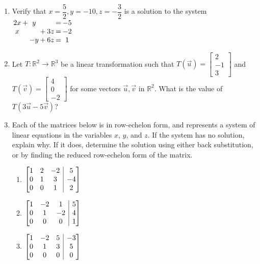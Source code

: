\documentclass[12pt]{article}
\makeatletter
\newcommand{\points}[1]{\marginpar{\hspace{24pt}[#1]}}
\newcommand{\R}{\mathbb{R}}
\newcommand{\bbm}{\begin{bmatrix}}
\newcommand{\ebm}{\end{bmatrix}}
\newenvironment{amatrix}[1]{%
  \left[\begin{array}{@{}*{#1}{c}|c@{}}
}{%
  \end{array}\right]
}
\makeatother
\begin{document}
\begin{enumerate}
\vspace{2in}

\item Verify that $x=\dfrac{5}{2}, y=-10, z=-\dfrac{3}{2}$ is a solution to the system \points{4} \hspace{12pt} $\arraycolsep=1pt
 \begin{array}{ccccccc}
  2x&+&y& & &=&-5\\x& & &+&3z&=&-2\\ & &-y&+&6z&=&1
 \end{array}
$


\vspace{2in}

\item Let $T:\R^2\to\R^3$ be a linear transformation such that $T(\vec{u}) = \bbm 2\\-1\\3\ebm$ and $T(\vec{v}) = \bbm 4\\0\\-2\ebm$ for some vectors $\vec{u}, \vec{v}$ in $\R^2$. What is the value of \points{4} $T(3\vec{u}-5\vec{v})$?

\newpage

\item Each of the matrices below is in row-echelon form, and represents a system of linear equations in the variables $x$, $y$, and $z$. If the system has no solution, explain why. If it does, determine the solution using either back substitution, or by finding the reduced row-echelon form of the matrix.\points{10}
\begin{enumerate}
 \item $\begin{amatrix}{3}1&2&-2&5\\0&1&3&-4\\0&0&1&2\end{amatrix}$ 

\vspace{2.25in}

 \item $\begin{amatrix}{3}1&-2&1&5\\0&1&-2&4\\0&0&0&1\end{amatrix}$ 

\vspace{2.25in}

 \item $\begin{amatrix}{3}1&-2&5&-3\\0&1&3&5\\0&0&0&0\end{amatrix}$ 
\end{enumerate}
 \newpage


\end{enumerate}
\end{document}
